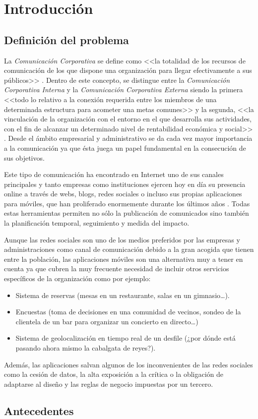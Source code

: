 \chapter{Introducción}
\section{Definición del problema}
La \emph{Comunicación Corporativa} se define como <<la totalidad de los recursos de comunicación de los que dispone una organización para llegar efectivamente a sus públicos>> \cite{riel_2001}. Dentro de este concepto, se distingue entre la \emph{Comunicación Corporativa Interna} y la \emph{Comunicación Corporativa Externa} siendo la primera <<todo lo relativo a la conexión requerida entre los miembros de una determinada estructura para acometer una metas comunes>> y la segunda, <<la vinculación de la organización con el entorno en el que desarrolla sus actividades, con el fin de alcanzar un determinado nivel de rentabilidad económica y social>> \cite{castro_2007}. Desde el ámbito empresarial y administrativo se da cada vez mayor importancia a la comunicación ya que ésta juega un papel fundamental en la consecución de sus objetivos.

Este tipo de comunicación ha encontrado en Internet uno de sus canales principales y tanto empresas como instituciones ejercen hoy en día su presencia online a través de webs, blogs, redes sociales o incluso sus propias aplicaciones para móviles, que han proliferado enormemente durante los últimos años \cite{playstore} \cite{appstore}. Todas estas herramientas permiten no sólo la publicación de comunicados sino también la planificación temporal, seguimiento y medida del impacto.

Aunque las redes sociales son uno de los medios preferidos por las empresas \cite{linkedin} y administraciones \cite{grande2015casos} como canal de comunicación debido a la gran acogida que tienen entre la población, las aplicaciones móviles son una alternativa muy a tener en cuenta ya que cubren la muy frecuente necesidad de incluir otros servicios específicos de la organización como por ejemplo:
\begin{itemize}
    \item Sistema de reservas (mesas en un restaurante, salas en un gimnasio\dots).
    \item Encuestas (toma de decisiones en una comunidad de vecinos, sondeo de la clientela de un bar para organizar un concierto en directo\dots)
    \item Sistema de geolocalización en tiempo real de un desfile (¿por dónde está pasando ahora mismo la cabalgata de reyes?).
\end{itemize}
Además, las aplicaciones salvan algunos de los inconvenientes de las redes sociales como la cesión de datos, la alta exposición a la crítica o la obligación de adaptarse al diseño y las reglas de negocio impuestas por un tercero.

\section{Antecedentes}

